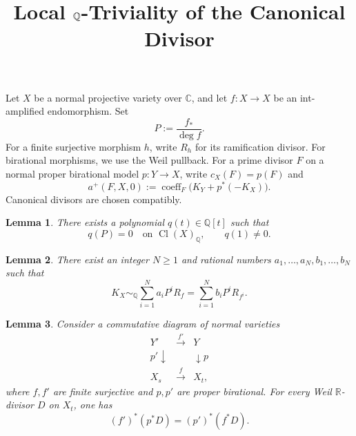 \documentclass[11pt,a4paper]{article}
\title{Local $\Q$-Triviality of the Canonical Divisor}
\author{}
\date{}
\newtheorem{lemma}{Lemma}
\newcommand{\Q}{\mathbb Q}
\newcommand{\R}{\mathbb R}
\newcommand{\C}{\mathbb C}
\DeclareMathOperator{\Cl}{Cl}
\DeclareMathOperator{\coeff}{coeff}
\begin{document}
\maketitle
\vspace{-2.2em}

Let $X$ be a normal projective variety over $\C$, and let $f:X\to X$
be an int-amplified endomorphism. Set
\[
 P:=\frac{f_*}{\deg f}.
\]
For a finite surjective morphism $h$, write $R_h$ for its ramification
divisor. For birational morphisms, we use the Weil pullback.
For a prime divisor $F$ on a normal proper birational model $p:Y\to X$,
write $c_X(F)=p(F)$ and
\[
 a^+(F,X,0):=\coeff_F\bigl(K_Y+p^*(-K_X)\bigr).
\]
Canonical divisors are chosen compatibly.

\begin{lemma}\label{lem:polynomial}
There exists a polynomial $q(t)\in\Q[t]$ such that
\[
 q(P)=0\quad\text{on }\Cl(X)_{\Q},
 \qquad q(1)\ne0.
\]
\end{lemma}

\begin{lemma}\label{lem:decomposition}
There exist an integer $N\ge1$ and rational numbers
$a_1,\ldots,a_N,b_1,\ldots,b_N$ such that
\[
 K_X\sim_{\Q}\sum_{i=1}^N a_iP^iR_f
     =\sum_{i=1}^N b_iP^iR_{f^i}.
\]
\end{lemma}

\begin{lemma}\label{lem:finite-base-change}
Consider a commutative diagram of normal varieties
\[
 \begin{array}{ccc}
  Y'&\xrightarrow{\ f'\ }&Y\\[2pt]
  {\scriptstyle p'}\downarrow&&\downarrow{\scriptstyle p}\\[2pt]
  X_s&\xrightarrow{\ f\ }&X_t,
 \end{array}
\]
where $f,f'$ are finite surjective and $p,p'$ are proper birational.
For every Weil $\R$-divisor $D$ on $X_t$, one has
\[
 (f')^*(p^*D)=(p')^*(f^*D).
\]
\end{lemma}
\end{document}
